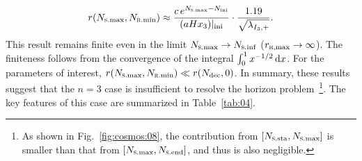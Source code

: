 \documentclass[aps,prd,twocolumn]{revtex4-2}
\newcommand\dx{{\rm d}}
\newcommand\subH{\textsc{h}}
\newcommand\subini{{\rm ini}}
\newcommand\subRmin{{\rm \textsc{r}.min}}
\newcommand\subSsta{{\rm \textsc{s}.sta}}
\newcommand\subSmax{{\rm \textsc{s}.max}}
\newcommand\subSend{{\rm \textsc{s}.end}}
\newcommand\subSinf{{\rm \textsc{s}.inf}}
\newcommand\submax{{\rm max}}
\begin{document}
\begin{equation}\label{eq:3.34}
  r(N_\subSmax,N_\subRmin) \approx \frac{c\,e^{N_\subSmax-N_\subini}}{(a H x_3)|_{\subini}} \cdot \frac{1.19}{\sqrt{\lambda_{I_3,+}}}.
\end{equation}
This result remains finite even in the limit $N_\subSmax\rightarrow N_\subSinf$ ($r_{\subH,\submax}\rightarrow\infty$). The finiteness follows from the convergence of the integral $\int_{0}^{1}x^{-1/2}\,\dx x$. For the parameters of interest, $r(N_\subSmax,N_\subRmin)\ll r(N_{\rm dec},0)$. In summary, these results suggest that the $n=3$ case is insufficient to resolve the horizon problem~\footnote{As shown in Fig.~\ref{fig:cosmos:08}, the contribution from $[N_\subSsta,N_\subSmax]$ is smaller than that from $[N_\subSmax,N_\subSend]$, and thus is also negligible.}. The key features of this case are summarized in Table~\ref{tab:04}.
\end{document}
